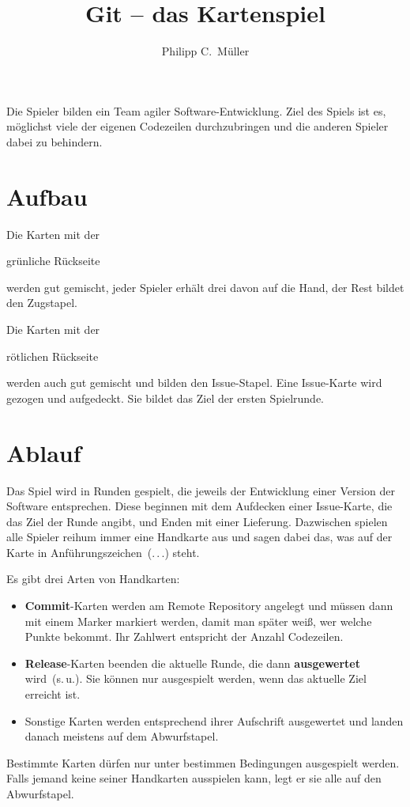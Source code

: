\documentclass[DIV=15, fontsize=11pt]{scrartcl}
\title{Git -- das Kartenspiel}
\author{Philipp C.\ Müller}
\newcommand\hugefont[1]{\raisebox{-5pt}{\fontsize{50}{60}\sffamily\bfseries\selectfont #1}}
\newcommand\bigfont[1]{{\fontsize{20}{24}\sffamily\bfseries\selectfont #1}}
\newcommand\textfontsize[1]{\fontsize{9}{10}\sffamily\selectfont #1}
\newcommand\rede[1]{\glqq #1\grqq{}}
\newcommand\textrule[1]{\textbf{#1}}
\newenvironment{CardFront}[1]{%
  \global\advance\cardnum by 1%
  \begin{tikzpicture}
    \draw[line width=\cardlinewidth, rounded corners=5mm] (0,0) rectangle (\cardwidth,\cardheight) coordinate (URex);

    \path (0,0)--(\cardwidth,\cardheight) coordinate[midway] (Center);
    \path (URex)--+(-\cardborder,-\cardborder) coordinate[midway] (URmed) coordinate (UR);
    \coordinate (ULex) at (0,\cardheight);
    \coordinate (LRex) at (\cardwidth,0);
    
    \fill[bgcolor, rounded corners=\cardborder] (\cardborder,\cardborder) coordinate (LL) rectangle (UR);
    
    \path (LL)-|(UR) coordinate[midway] (LR);
    \path (LL)|-(UR) coordinate[midway] (UL);
    \path (UL)--(ULex) coordinate[midway] (ULmed);
    \path (LL)-|(UR) coordinate[midway] (LR);
    \path (LL)--(0,0) coordinate[midway] (LLmed);
    \path (LR)--(LRex) coordinate[midway] (LRmed);

    \path (Center)+(0,0.075\cardheight) coordinate (UCenter);
	
	\path (UCenter)+(0,0.25\cardheight) node {\bigfont{#1}};
}{
  \end{tikzpicture}%
  \ifnum\cardnum>2
	\global\cardnum=0

	\vskip-1pt
  \fi
}
\newcommand\CardTextField[1]{%
    \path (UCenter)+(0,-0.25\cardwidth-0.015\cardheight) node[anchor=north] {%
	\begin{minipage}{\cardtextwidth}
		\textfontsize\rightskip0pt minus 0.25em
		#1
	\end{minipage}};
}
\newcommand\CardFrontTikzBase[3]{%
	\begin{CardFront}{#1}
		#2
		
		\CardTextField{#3}
	\end{CardFront}%
}
\newcommand\CardFrontTikzCircle[4]{%
	\CardFrontTikzBase{#1}{%
		\draw[line width=1.5pt, fill=#3] (UCenter) circle[radius=0.25*\cardwidth];
		#2}{#4}%
}
\newcommand\CalcNumberColor[1]{%
	\ifnum#1<0
		\colorlet{numcolor}{errorcolor}%
	\else%
		\ifnum#1<8%
			\auxnum=#1
			\ifnum#1=0\else\advance\auxnum by -1\fi%
			\multiply\auxnum by 14
			\colorlet{numcolor}{middlecolor!\the\auxnum!nullcolor}%
		\else%
			\ifnum#1<32
				\auxnum=#1
				\advance\auxnum by -8
				\multiply\auxnum by 42
				\divide\auxnum by 10
				\colorlet{numcolor}{highcolor!\the\auxnum!middlecolor}%
			\else%
				\colorlet{numcolor}{highcolor}%
			\fi%
		\fi%
	\fi%
%
	\auxnum=#1
	\ifnum\auxnum<0\else%
		\ifnum\auxnum<16
			\def\sixteen{white}%
		\else%
			\def\sixteen{black}%
			\advance\auxnum by -16
		\fi%
		\ifnum\auxnum<8
			\def\eight{white}%
		\else%
			\def\eight{black}%
			\advance\auxnum by -8
		\fi%
		\ifnum\auxnum<4
			\def\four{white}%
		\else%
			\def\four{black}%
			\advance\auxnum by -4
		\fi%
		\ifnum\auxnum<2
			\def\two{white}%
		\else%
			\def\two{black}%
			\advance\auxnum by -2
		\fi%
		\ifnum\auxnum<1%
			\def\one{white}%
		\else%
			\def\one{black}%
		\fi%
	\fi%
	\auxnum=#1
}
\newcommand\DrawNumber[1][]{
	\ifnum\auxnum<0
		\path (UCenter)+(0,0.025\cardwidth) node[anchor=center] {#1\hugefont{X}};
	\else
		\path (UCenter)+(0,0.025\cardwidth) node[anchor=center] {#1\hugefont{\number\auxnum}};
		\ifnum\auxnum<16
			\path (UCenter)++(-0.09*\cardwidth,-0.125*\cardwidth) coordinate (aux);
		\else
			\path (UCenter)++(-0.12*\cardwidth,-0.125*\cardwidth) coordinate (aux);
			\draw[fill=\sixteen] (aux) circle[radius=1mm];
			\path (aux)++(0.06*\cardwidth,0) coordinate (aux);
		\fi
		\draw[fill=\eight] (aux) circle[radius=1mm];
		\path (aux)++(0.06*\cardwidth,0) coordinate (aux);
		\draw[fill=\four] (aux) circle[radius=1mm];
		\path (aux)++(0.06*\cardwidth,0) coordinate (aux);
		\draw[fill=\two] (aux) circle[radius=1mm];
		\path (aux)++(0.06*\cardwidth,0) coordinate (aux);
		\draw[fill=\one] (aux) circle[radius=1mm];
	\fi
}
\newcommand\DrawNumberBorder{%
	\ifnum\auxnum>0%
		\node[draw, line width=1pt, fill=numcolor, circle, inner sep=0pt, anchor=north west] at (ULmed) {\hphantom{\bigfont{0}}\clap{\bigfont{\number\auxnum}}\hphantom{\bigfont{0}}};%
		\node[draw, line width=1pt, fill=numcolor, circle, inner sep=0pt, anchor=north east] at (URmed) {\hphantom{\bigfont{0}}\clap{\bigfont{\number\auxnum}}\hphantom{\bigfont{0}}};%
		\node[draw, line width=1pt, fill=numcolor, circle, inner sep=0pt, anchor=north east, rotate=180] at (LLmed) {\hphantom{\bigfont{0}}\clap{\bigfont{\number\auxnum}}\hphantom{\bigfont{0}}};%
		\node[draw, line width=1pt, fill=numcolor, circle, inner sep=0pt, anchor=north west, rotate=180] at (LRmed) {\hphantom{\bigfont{0}}\clap{\bigfont{\number\auxnum}}\hphantom{\bigfont{0}}};%
	\fi
}
\newcommand\CardFrontCommit[2][\centering\rede{git push!}]{%
	\CalcNumberColor{#2}%
	\CardFrontTikzCircle{commit}{\DrawNumber\DrawNumberBorder}{numcolor}{#1}%
}
\begin{document}
\maketitle

Die Spieler bilden ein Team agiler Software-Entwicklung. Ziel des Spiels ist es, möglichst viele der eigenen Codezeilen durchzubringen und die anderen Spieler dabei zu behindern.



\section{Aufbau}\fboxsep=0pt
Die Karten mit der \colorbox{bgcolor1}{grünliche Rückseite\strut} werden gut gemischt, jeder Spieler erhält drei davon auf die Hand, der Rest bildet den Zugstapel.

Die Karten mit der \colorbox{bgcolor2}{rötlichen Rückseite\strut} werden auch gut gemischt und bilden den Issue-Stapel. Eine Issue-Karte wird gezogen und aufgedeckt. Sie bildet das Ziel der ersten Spielrunde.



\section{Ablauf}
Das Spiel wird in Runden gespielt, die jeweils der Entwicklung einer Version der Software entsprechen. Diese beginnen mit dem Aufdecken einer Issue-Karte, die das Ziel der Runde angibt, und Enden mit einer Lieferung. Dazwischen spielen alle Spieler reihum immer eine Handkarte aus und sagen dabei das, was auf der Karte in Anführungszeichen~(\rede{.\,.\,.}) steht.

Es gibt drei Arten von Handkarten:
\begin{itemize}
	\item \textrule{Commit}-Karten werden am Remote Repository angelegt und müssen dann mit einem Marker markiert werden, damit man später weiß, wer welche Punkte bekommt. Ihr Zahlwert entspricht der Anzahl Codezeilen.
	\item \textrule{Release}-Karten beenden die aktuelle Runde, die dann \textrule{ausgewertet} wird~(s.\,u.). Sie können nur ausgespielt werden, wenn das aktuelle Ziel erreicht ist.
	\item Sonstige Karten werden entsprechend ihrer Aufschrift ausgewertet und landen danach meistens auf dem Abwurfstapel.
\end{itemize}

Bestimmte Karten dürfen nur unter bestimmen Bedingungen ausgespielt werden. Falls jemand keine seiner Handkarten ausspielen kann, legt er sie alle auf den Abwurfstapel.
\end{document}

